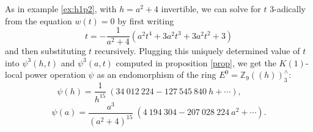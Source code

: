 \documentclass{gtpart}
\theoremstyle{definition}
\theoremstyle{remark}
\newcommand{\mb}[1]{\mathbb{#1}}
\begin{document}
As in example \ref{ex:h1p2}, with $h = a^2 + 4$ invertible, we can solve for 
$t$ 3-adically from the equation $w(t) = 0$ by first writing 
\[
 t = -\frac{1}{a^2 + 4}(a^2 t^4 + 3 a^2 t^3 + 3 a^2 t^2 + 3) 
\]
and then substituting $t$ recursively.  Plugging this uniquely determined 
value of $t$ into $\psi^3(h,t)$ and $\psi^3(a,t)$ computed in proposition 
\ref{prop}, we get the $K(1)$-local power operation $\psi$ as an endomorphism 
of the ring $E^0 = {\mb Z}_9 (\!(h)\!)_3^\wedge$: 
\[
 \psi(h) = \frac{1}{h^{15}}~(34~012~224 - 127~545~840~h + \cdots), ~~~~~~~~~~ 
\]
\[
 \psi(a) = \frac{a^3}{(a^2+4)^{15}}~(4~194~304 - 207~028~224~a^2 + \cdots).  
\]


\newpage

%
%
\end{document}
